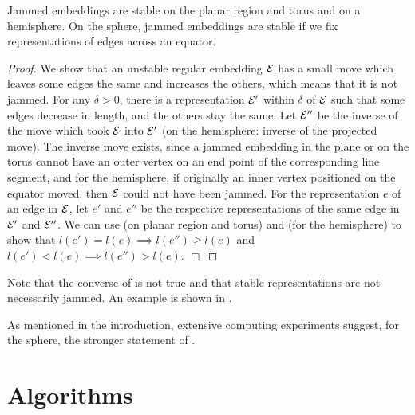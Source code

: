 \documentclass[invmat]{svjour}
\begin{document}
\begin{proposition}
\label{p:jammed_stable}
Jammed embeddings are stable on the planar region and torus and on
a hemisphere. On the sphere, jammed embeddings are stable if we fix
representations of edges across an equator.
\end{proposition}

\begin{proof}
We show that an unstable regular embedding
$\mathcal{E}$ has a small move which leaves some edges the same and increases
the others, which means that it is not jammed.
For any $\delta>0$, there is a representation $\mathcal{E}'$ within $\delta$  of
$\mathcal{E}$ such that some edges decrease in length, and the others stay the same.
Let $\mathcal{E}''$ be the inverse of the move which took $\mathcal{E}$ into $\mathcal{E}'$
(on the hemisphere: inverse of the projected move).
The inverse move exists, since a jammed embedding in the plane or on the torus
 cannot have an outer vertex on an end point of the corresponding line segment,
and for the hemisphere, if originally an inner vertex positioned
on the equator moved, then $\mathcal{E}$ could not have been jammed.
For the representation $e$ of an edge in  $\mathcal{E}$, let $e'$ and $e''$ be the
respective representations of the same edge in $\mathcal{E}'$ and $\mathcal{E}''$.
We can use  (on planar
region and torus) and  (for the hemisphere) to show
that
$l(e')=l(e) \implies l(e'') \ge l(e)$ and $l(e')< l(e) \implies l(e'') > l(e)$.
$\Box$
\end{proof}
Note that the converse of  is not true and that
stable representations are not necessarily jammed.
An example is shown in .

As mentioned in the introduction, extensive computing experiments suggest,
for the sphere, the stronger statement of .


\section{Algorithms}
\label{s:algorithm}
\end{document}
